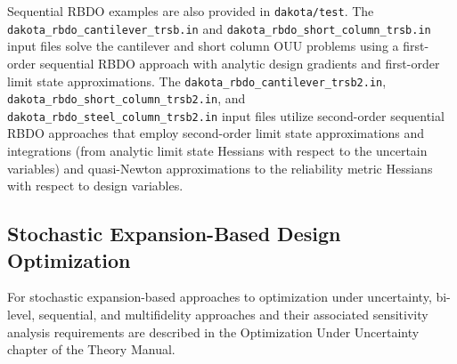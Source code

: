 Sequential RBDO examples are also provided in \texttt{dakota/test}.  
The \texttt{dakota\_rbdo\_cantilever\_trsb.in} and
\texttt{dakota\_rbdo\_short\_column\_trsb.in} input files solve 
the cantilever and short column OUU problems using a first-order
sequential RBDO approach with analytic design gradients and
first-order limit state approximations.  The
\texttt{dakota\_rbdo\_cantilever\_trsb2.in},
\texttt{dakota\_rbdo\_short\_column\_trsb2.in}, and 
\texttt{dakota\_rbdo\_steel\_column\_trsb2.in} input files 
utilize second-order sequential RBDO approaches that employ
second-order limit state approximations and integrations (from
analytic limit state Hessians with respect to the uncertain variables)
and quasi-Newton approximations to the reliability metric Hessians
with respect to design variables.

\subsection{Stochastic Expansion-Based Design Optimization} \label{adv_models:ouu:sebdo}

For stochastic expansion-based approaches to optimization under
uncertainty, bi-level, sequential, and multifidelity approaches and
their associated sensitivity analysis requirements are described in
the Optimization Under Uncertainty chapter of the Theory Manual.

